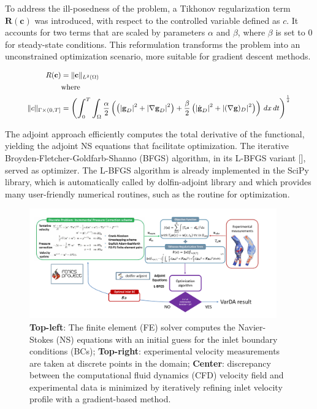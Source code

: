 To address the ill-posedness of the problem, a Tikhonov regularization term $\textbf{R}(\textbf{c})$ was introduced, with respect to the controlled variable defined as $c$. It accounts for two terms that are scaled by parameters \(\alpha\) and \(\beta\), where \(\beta\) is set to $0$ for steady-state conditions. This reformulation transforms the problem into an unconstrained optimization scenario, more suitable for gradient descent methods. 

\begin{equation}
\small
    \begin{aligned}
        R(\mathbf{c}) &= \| \mathbf{c} \|_{L^2(\Omega)} \\
        &\text{where} \\
        \small
        \|c\|_{\Gamma \times (0, T]} &= \left( \int_0^T \int_{\Omega} \frac{\alpha}{2} \left( \left(|\textbf{g}_D|^2 + |\nabla \textbf{g}_D|^2 \right) + \frac{\beta}{2} \left( |\dot{\textbf{g}}_D|^2 +  |(\nabla \textbf{g})_D|^2 \right) \right) \, dx \, dt \right)^{\frac{1}{2}}
    \end{aligned}
    \label{eq:12} 
\end{equation}

The adjoint approach efficiently computes the total derivative of the functional, yielding the adjoint NS equations that facilitate optimization. The iterative Broyden-Fletcher-Goldfarb-Shanno (BFGS) algorithm, in its L-BFGS variant [\cite{Liu1989}], served as optimizer. The L-BFGS algorithm is already implemented in the SciPy library, which is automatically
called by dolfin-adjoint library and which provides many user-friendly numerical routines, such as the routine for optimization.


\begin{figure}
    \centering
    \includegraphics[width=0.95\textwidth]{chapters/paratico/Fig1.1.pdf}
    \caption{\small \textbf{Top-left}: The finite element (FE) solver computes the Navier-Stokes (NS) equations with an initial guess for the inlet boundary conditions (BCs); \textbf{Top-right}: experimental velocity measurements are taken at discrete points in the domain; \textbf{Center}: discrepancy between the computational fluid dynamics (CFD) velocity field and experimental data is minimized by iteratively refining inlet velocity profile with a gradient-based method.}
    \label{fig:scheme}
\end{figure}

